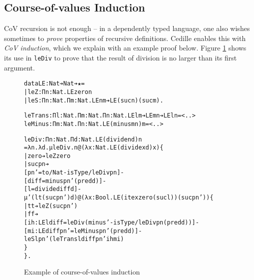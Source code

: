 \documentclass{article}
\begin{document}
\subsection{Course-of-values Induction}
CoV recursion is not enough -- in a dependently typed language, one also wishes
sometimes to \textit{prove} properties of recursive definitions. Cedille enables
this with \textit{CoV induction}, which we explain with an example proof below.
Figure \ref{fig:cov-induction} shows its use in \texttt{leDiv} to prove that the
result of division is no larger than its first argument.

\begin{figure}[h]
\begin{alltt}
data LE: Nat ➔ Nat ➔ ★ =
  | leZ: Π n: Nat. LE zero n
  | leS: Π n: Nat. Π m: Nat. LE n m ➔ LE (suc n) (suc m).

leTrans: Π l: Nat. Π m: Nat. Π n: Nat. LE l m ➔ LE m n ➔ LE l n = <..>
leMinus: Π m: Nat. Π n: Nat. LE (minus m n) m = <..>

leDiv: Π n: Nat. Π d: Nat. LE (divide n d) n
  = λ n. λ d. μ leDiv. n @(λ x: Nat. LE (divide x d) x) \{
  | zero ➔ leZ zero
  | suc pn ➔
    [pn' = to/Nat -isType/leDiv pn] -
    [diff = minus pn' (pred d)] -
    [l = divide diff d] -
      μ' (lt (suc pn') d) @(λ x: Bool. LE (ite x zero (suc l)) (suc pn')) \{
      | tt ➔ leZ (suc pn')
      | ff ➔
        [ih: LE l diff   = leDiv (minus' -isType/leDiv pn (pred d))] -
        [mi: LE diff pn' = leMinus pn' (pred d)] -
          leS l pn' (leTrans l diff pn' ih mi)
      \}
  \}.
\end{alltt}
  \caption{Example of course-of-values induction}
  \label{fig:cov-induction}
\end{figure}
\end{document}
